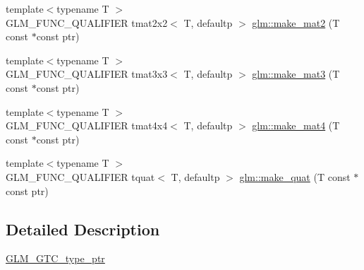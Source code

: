 \begin{DoxyCompactItemize}
\item 
{\footnotesize template$<$typename T $>$ }\\G\+L\+M\+\_\+\+F\+U\+N\+C\+\_\+\+Q\+U\+A\+L\+I\+F\+I\+ER tmat2x2$<$ T, defaultp $>$ \hyperlink{group__gtc__type__ptr_ga52a16e333fef7e33ca740779482a8693}{glm\+::make\+\_\+mat2} (T const $\ast$const ptr)
\item 
{\footnotesize template$<$typename T $>$ }\\G\+L\+M\+\_\+\+F\+U\+N\+C\+\_\+\+Q\+U\+A\+L\+I\+F\+I\+ER tmat3x3$<$ T, defaultp $>$ \hyperlink{group__gtc__type__ptr_gac2bc10c519ffc8db9e24f325f23787ea}{glm\+::make\+\_\+mat3} (T const $\ast$const ptr)
\item 
{\footnotesize template$<$typename T $>$ }\\G\+L\+M\+\_\+\+F\+U\+N\+C\+\_\+\+Q\+U\+A\+L\+I\+F\+I\+ER tmat4x4$<$ T, defaultp $>$ \hyperlink{group__gtc__type__ptr_ga2c6e6d457cb932e1ce683e4f690a6f60}{glm\+::make\+\_\+mat4} (T const $\ast$const ptr)
\item 
{\footnotesize template$<$typename T $>$ }\\G\+L\+M\+\_\+\+F\+U\+N\+C\+\_\+\+Q\+U\+A\+L\+I\+F\+I\+ER tquat$<$ T, defaultp $>$ \hyperlink{group__gtc__type__ptr_gaadafb6600af2633e4c98cc64c72f5269}{glm\+::make\+\_\+quat} (T const $\ast$const ptr)
\end{DoxyCompactItemize}


\subsection{Detailed Description}
\hyperlink{group__gtc__type__ptr}{G\+L\+M\+\_\+\+G\+T\+C\+\_\+type\+\_\+ptr} 